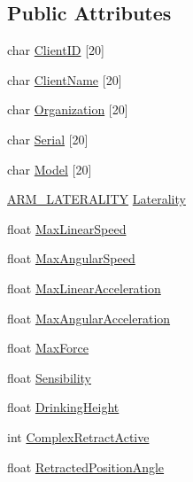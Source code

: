 \subsection*{Public Attributes}
\begin{DoxyCompactItemize}
\item 
char \hyperlink{struct_client_configurations_af6f24946f2f285f1075291b4bcca49d6}{Client\-I\-D} \mbox{[}20\mbox{]}
\item 
char \hyperlink{struct_client_configurations_a5c4ef3ba3bcbd4f749fa3862a510e2fd}{Client\-Name} \mbox{[}20\mbox{]}
\item 
char \hyperlink{struct_client_configurations_a6c2d5ccc0c22fcf0a622ed00cb00b707}{Organization} \mbox{[}20\mbox{]}
\item 
char \hyperlink{struct_client_configurations_ae8b80eeae05a07973875ff48a40cf8b4}{Serial} \mbox{[}20\mbox{]}
\item 
char \hyperlink{struct_client_configurations_a7fe79480a20eea089303d95b615ae807}{Model} \mbox{[}20\mbox{]}
\item 
\hyperlink{_kinova_types_8h_a440ce9d9a9bb4ab164bd4cd018595a28}{A\-R\-M\-\_\-\-L\-A\-T\-E\-R\-A\-L\-I\-T\-Y} \hyperlink{struct_client_configurations_ab1da95ec401d00e7ea9bcff26fbfc0c3}{Laterality}
\item 
float \hyperlink{struct_client_configurations_adbd9eed48ee80ee3ccfdb69872c8de27}{Max\-Linear\-Speed}
\item 
float \hyperlink{struct_client_configurations_ab7f703d78b05223499d278d9bbb4bebf}{Max\-Angular\-Speed}
\item 
float \hyperlink{struct_client_configurations_af79f54907501602fb29a7a301ccd2921}{Max\-Linear\-Acceleration}
\item 
float \hyperlink{struct_client_configurations_a564aab9ca96f42161d7969c81bff1331}{Max\-Angular\-Acceleration}
\item 
float \hyperlink{struct_client_configurations_a9c68b6f56291d1be104928f7db071579}{Max\-Force}
\item 
float \hyperlink{struct_client_configurations_a64e61dc032b95f127cd798a9759818d8}{Sensibility}
\item 
float \hyperlink{struct_client_configurations_a05043c8fe2f31f3c216a97edc2411664}{Drinking\-Height}
\item 
int \hyperlink{struct_client_configurations_aa41bf35ba1a1dd92f54a30814d42f795}{Complex\-Retract\-Active}
\item 
float \hyperlink{struct_client_configurations_ad7d6245d4683b6e31d0438466ea6bb80}{Retracted\-Position\-Angle}

\end{DoxyCompactItemize}

